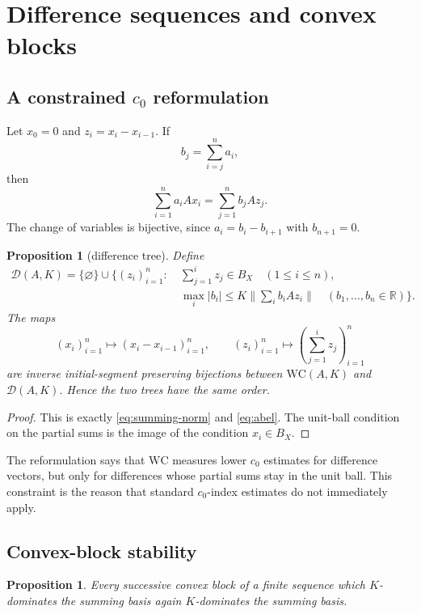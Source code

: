 \documentclass[11pt]{article}
\newtheorem{proposition}[theorem]{Proposition}
\theoremstyle{definition}
\theoremstyle{remark}
\newcommand{\WC}{\mathrm{WC}}
\newcommand{\R}{\mathbb R}
\newcommand{\cD}{\mathcal D}
\begin{document}
\section{Difference sequences and convex blocks}

\subsection{A constrained $c_0$ reformulation}

Let $x_0=0$ and $z_i=x_i-x_{i-1}$.  If
\[
   b_j=\sum_{i=j}^n a_i,
\]
then
\begin{equation}\label{eq:abel}
   \sum_{i=1}^n a_iAx_i=\sum_{j=1}^n b_jAz_j.
\end{equation}
The change of variables is bijective, since $a_i=b_i-b_{i+1}$ with $b_{n+1}=0$.

\begin{proposition}[difference tree]\label{prop:difference-tree}
Define
\[
\begin{split}
 \cD(A,K)=\{\varnothing\}\cup\bigl\{(z_i)_{i=1}^n:
 &\ \sum_{j=1}^i z_j\in B_X\quad(1\leq i\leq n),\\
 &\ \max_i|b_i|\leq K\|\sum_i b_iAz_i\|
       \quad(b_1,\dots,b_n\in\R)\bigr\}.
\end{split}
\]
The maps
\[
   (x_i)_{i=1}^n\longmapsto(x_i-x_{i-1})_{i=1}^n,
   \qquad
   (z_i)_{i=1}^n\longmapsto\left(\sum_{j=1}^i z_j\right)_{i=1}^n
\]
are inverse initial-segment preserving bijections between $\WC(A,K)$ and $\cD(A,K)$.  Hence the two trees have the same order.
\end{proposition}

\begin{proof}
This is exactly \eqref{eq:summing-norm} and \eqref{eq:abel}.  The unit-ball condition on the partial sums is the image of the condition $x_i\in B_X$.
\end{proof}

The reformulation says that $\WC$ measures lower $c_0$ estimates for difference vectors, but only for differences whose partial sums stay in the unit ball.  This constraint is the reason that standard $c_0$-index estimates do not immediately apply.

\subsection{Convex-block stability}

\begin{proposition}\label{prop:convex-block}
Every successive convex block of a finite sequence which $K$-dominates the summing basis again $K$-dominates the summing basis.
\end{proposition}
\end{document}
